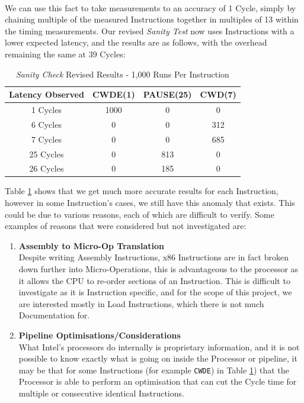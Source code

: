 \documentclass[bsc,frontabs,twoside,singlespacing,parskip,deptreport]{infthesis}     %
\begin{document}
\\
We can use this fact to take measurements to an accuracy of 1 Cycle, simply by chaining multiple of the measured Instructions together in multiples of 13 within the timing measurements. Our revised \textit{Sanity Test} now uses Instructions with a lower expected latency, and the results are as follows, with the overhead remaining the same at 39 Cycles:

\begin{table}[!h]
\begin{center}
\caption{\textit{Sanity Check} Revised Results - 1,000 Runs Per Instruction}
\label{fig:sanity-results-2}
\begin{tabular}{ |c||c|c|c| } 
    \hline
    Latency Observed & CWDE(1) & PAUSE(25) & CWD(7) \\
    \hline
    1 Cycles   & 1000 & 0   & 0   \\
    6 Cycles   & 0    & 0   & 312 \\
    7 Cycles   & 0    & 0   & 685 \\
    25 Cycles  & 0    & 813 & 0 \\
    26 Cycles  & 0    & 185 & 0   \\
    \hline
\end{tabular}
\end{center}
\end{table}

Table \ref{fig:sanity-results-2} shows that we get much more accurate results for each Instruction, however in some Instruction's cases, we still have this anomaly that exists. This could be due to various reasons, each of which are difficult to verify. Some examples of reasons that were considered but not investigated are:

\begin{enumerate}
    \item{{\bf Assembly to Micro-Op Translation} \\
        Despite writing Assembly Instructions, x86 Instructions are in fact broken down further into Micro-Operations, this is advantageous to the processor as it allows the CPU to re-order sections of an Instruction. This is difficult to investigate as it is Instruction specific, and for the scope of this project, we are interested mostly in Load Instructions, which there is not much Documentation for.
    }
    \item{{\bf Pipeline Optimisations/Considerations} \\
        What Intel's processors do internally is proprietary information, and it is not possible to know exactly what is going on inside the Processor or pipeline, it may be that for some Instructions (for example \texttt{CWDE}) in Table \ref{fig:sanity-results-2}) that the Processor is able to perform an optimisation that can cut the Cycle time for multiple or consecutive identical Instructions.
    }
\end{enumerate}
\end{document}
